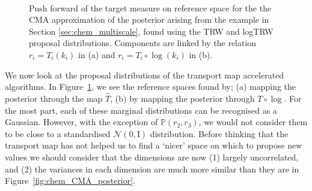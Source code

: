 \documentclass[final]{siamltex}
\begin{document}
\begin{figure}[!htb]
\centering
{}
\\
\caption{Push forward of the target measure on reference space for the the CMA
  approximation of the  posterior arising from the example in Section \ref{sec:chem_multiscale}, found using the TRW and logTRW proposal distributions. Components are linked by the relation $r_i = T_i(k_i)$ in (a) and $r_i = T_i\circ\log(k_i)$ in (b).}
\label{fig:chem_reference_spaces}
\end{figure}

We now look at the proposal distributions of the transport map accelerated algorithms. In Figure~\ref{fig:chem_reference_spaces}, we see the reference spaces found by; (a) mapping the posterior through the map $\hat{T}$, (b) by mapping the posterior through $T\circ\log$. For the most part, each of these marginal distributions can be recognised as a Gaussian. However, with the exception of $\mathbb{P}(r_2,r_3)$, we would not consider them to be close to a standardised $\mathcal{N}(0, \text{I})$ distribution. Before thinking that the transport map has not helped us to find a `nicer' space on which to propose new values we should consider that the dimensions are now (1) largely uncorrelated, and (2) the variances in each dimension are much more similar than they are in Figure~\ref{fig:chem_CMA_posterior}.
\end{document}
